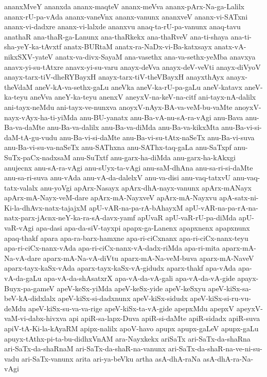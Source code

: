 {ananxMveY
ananxda
ananx-maqteV
ananx-meVva
ananx-pArx-Na-ga-Lalilx
ananx-rU-pa-vAda
ananx-vaneVnx
ananx-vanunx
ananxveV
ananx-vi-SATxni
ananx-vi-dadxre
ananx-vi-lalxde
ananxvu
anaq-ta-rU-pa-vanunx
anaq-tavu
anathaR
ana-thaR-ga-Lanunx
ana-thaRkekx
ana-thaRveV
ana-ti-shaya
ana-ti-sha-yeY-ka-tAvxtf
anatx-BURtaM
anatx-ra-NaDx-vi-Ba-katxsayx
anatx-vA-nikxSXV-yateV
anatx-va-divx-SayaM
ana-vasethx
ana-va-sethx-yeMba
anavxya
anavx-yi-su-tAtxre
anavx-yi-su-varu
anayx-deVva
anayx-deV-veVti
anayx-diVyoV
anayx-tarx-tiV-dheRYBayxH
anayx-tarx-tiV-theVBayxH
anayxthAyx
anayx-theVdaM
aneV-kA-va-sethx-gaLu
aneVka
aneV-ka-rU-pa-gaLu
aneV-katavx
aneV-ka-teyu
aneVva
aneY-ka-teyu
anenxV
aneyxV-na-keV-na-citf
ani-tayx-nA-dalilx
ani-tayx-neMdu
ani-tayx-ve-nunxva
anoyxV-nAyx-BA-va-veM-bu-vaMte
anoyxV-nayx-vAyx-ha-ti-yiMda
anu-BU-yanatx
anu-Ba-vA-nu-sA-ra-vAgi
anu-Bava
anu-Ba-va-daMte
anu-Ba-va-dalilx
anu-Ba-va-diMda
anu-Ba-va-kikxMta
anu-Ba-vi-si-daM-tA-gu-vudu
anu-Ba-vi-si-daMte
anu-Ba-vi-su-tAtx-naSeTx
anu-Ba-vi-suva
anu-Ba-vi-su-va-naSeTx
anu-SAThxna
anu-SAThx-taq-gaLa
anu-SaTxpf
anu-SuTx-paCx-nadxsaM
anu-SuTxtf
anu-garx-ha-diMda
anu-garx-ha-kAkxgi
anujecnx
anu-sA-ra-vAgi
anu-sUyx-ta-vAgi
anu-saM-dhAna
anu-sa-ri-si-daMte
anu-sa-ri-suva
anu-vAda
anu-vA-da-dalelxV
anu-va-disi
anu-vaq-tatxvU
anu-vaq-tatx-valalx
anu-yoVgi
apArx-Nasayx
apArx-dhA-nayx-vanunx
apArx-mANayx
apArx-mA-Nayx-veM-dare
apArx-mA-NayxveV
apArx-mA-Nayxvu
apA-satx-ni-Ki-la-dhAvx-natx-tajajxM
apU-vAR-na-pa-rA-bAhayxM
apU-vAR-na-pa-rA-na-natx-parx-jAcnx-neY-ka-ra-sA-davx-yamf
apUvaR
apU-vaR-rU-pa-diMda
apU-vaR-vAgi
apa-dasi
apa-da-siV-tayxpi
apapx-ga-Lanenx
apapxnenx
apapxnunx
apaq-thakf
apara
apa-ra-barx-hamxne
apa-ri-ciCxnanx
apa-ri-ciCx-nanx-teyu
apa-ri-ciCx-nanx-vAda
apa-ri-ciCx-nanx-vA-dadx-riMda
apa-ri-mita
aparx-mA-Na-vA-dare
aparx-mA-Na-vA-diVtu
aparx-mA-Na-veM-buva
aparx-mA-NaveV
aparx-tayx-kaSx-vAda
aparx-tayx-kaSx-vA-gidudx
aparx-thakf
apa-vAda
apa-vA-da-gaLu
apa-vA-da-shAsatxrX
apa-vA-da-vA-gali
apa-vA-da-vA-gide
apayx-Buyx-pa-gameV
apeV-keSx-yiMda
apeV-keSx-yide
apeV-keSxyu
apeV-kiSx-sa-beV-kA-didxlalx
apeV-kiSx-si-dadxnunx
apeV-kiSx-sidudx
apeV-kiSx-si-ru-vu-deMdu
apeV-kiSx-su-va-va-rige
apeV-kiSx-ta-vA-gide
apepxMdu
apepxV
apeyxV-vaM-vi-dabx-hivxva
api
apiR-sa-lapx-Duva
apiR-si-daMte
apiR-sidadx
apiR-suva
apiV-tA-Ki-la-kAyaRM
apipx-nalilx
apoV-havo
apupx
apupx-gaLeV
apupx-gaLu
apuyx-tAthx-pi-ta-bu-didhxVnAM
ara-Nayxkekx
ariSaTx
ari-SaTx-da-shaRna
ari-SaTx-da-shaRnaM
ari-SaTx-da-shaR-na-vanunx
ari-SaTx-da-shaR-na-ve-ni-su-vadu
ari-SaTx-vanunx
arita
ari-ya-beVku
artha
asA-dhA-raNa
asA-dhA-ra-Na-vAgi
}
